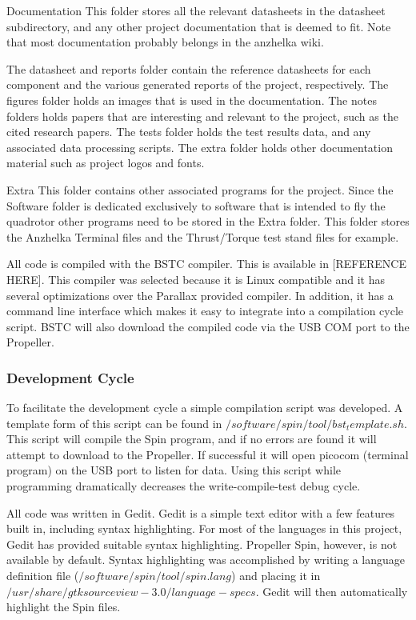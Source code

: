 \documentclass{article}
\numberwithin{equation}{section} %
\begin{document}
Documentation 
This folder stores all the relevant datasheets in the datasheet subdirectory, and any other project documentation that is deemed to fit. Note that most documentation probably belongs in the anzhelka wiki. 

The datasheet and reports folder contain the reference datasheets for each component and the various generated reports of the project, respectively. The figures folder holds an images that is used in the documentation. The notes folders holds papers that are interesting and relevant to the project, such as the cited research papers. The tests folder holds the test results data, and any associated data processing scripts. The extra folder holds other documentation material such as project logos and fonts. 

Extra 
This folder contains other associated programs for the project. Since the Software folder is dedicated exclusively to software that is intended to fly the quadrotor other programs need to be stored in the Extra folder. This folder stores the Anzhelka Terminal files and the Thrust/Torque test stand files for example.

All code is compiled with the BSTC compiler. This is available in [REFERENCE HERE]. This compiler was selected because it is Linux compatible and it has several optimizations over the Parallax provided compiler. In addition, it has a command line interface which makes it easy to integrate into a compilation cycle script. BSTC will also download the compiled code via the USB COM port to the Propeller.

\subsubsection{Development Cycle}
To facilitate the development cycle a simple compilation script was developed. A template form of this script can be found in $/software/spin/tool/bst_template.sh$. This script will compile the Spin program, and if no errors are found it will attempt to download to the Propeller. If successful it will open picocom (terminal program) on the USB port to listen for data. Using this script while programming dramatically decreases the write-compile-test debug cycle.

All code was written in Gedit. Gedit is a simple text editor with a few features built in, including syntax highlighting. For most of the languages in this project, Gedit has provided suitable syntax highlighting. Propeller Spin, however, is not available by default. Syntax highlighting was accomplished by writing a language definition file ($/software/spin/tool/spin.lang$) and placing it in $/usr/share/gtksourceview-3.0/language-specs$. Gedit will then automatically highlight the Spin files.
\end{document}
